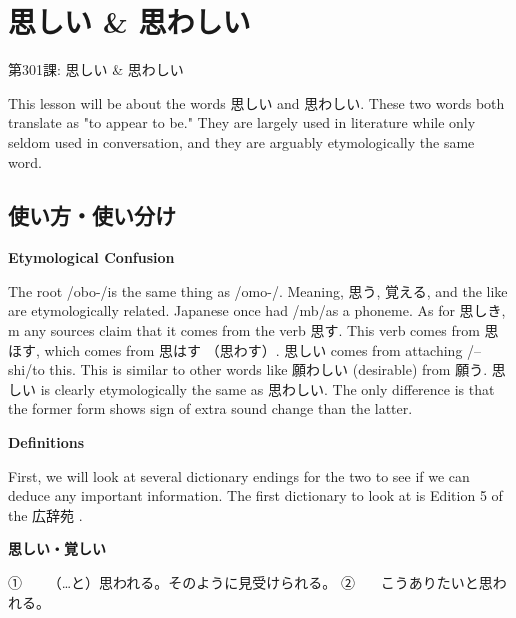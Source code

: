     
\chapter{思しい \& 思わしい}

\begin{center}
\begin{Large}
第301課: 思しい \& 思わしい 
\end{Large}
\end{center}
 
\par{ This lesson will be about the words 思しい and 思わしい. These two words both translate as "to appear to be." They are largely used in literature while only seldom used in conversation, and they are arguably etymologically the same word. }
      
\section{使い方・使い分け}
 
\begin{center}
 \textbf{Etymological Confusion }
\end{center}

\par{ The root \slash obo-\slash  is the same thing as \slash omo-\slash . Meaning, 思う, 覚える, and the like are etymologically related. Japanese once had \slash mb\slash  as a phoneme. As for 思しき, m any sources claim that it comes from the verb 思す. This verb comes from 思ほす, which comes from 思はす （思わす）. 思しい comes from attaching \slash –shi\slash  to this. This is similar to other words like 願わしい (desirable) from 願う. 思しい is clearly etymologically the same as 思わしい. The only difference is that the former form shows sign of extra sound change than the latter. }

\begin{center}
 \textbf{Definitions }
\end{center}

\par{ First, we will look at several dictionary endings for the two to see if we can deduce any important information. The first dictionary to look at is Edition 5 of the 広辞苑 . }

\par{\textbf{思しい・覚しい }}

\par{①    （…と）思われる。そのように見受けられる。 \hfill\break
②    こうありたいと思われる。 }

